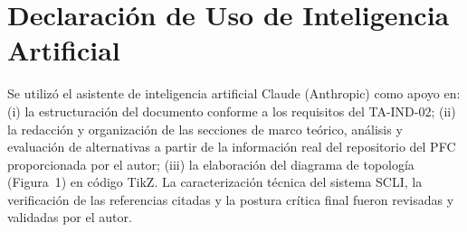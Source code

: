 \documentclass[12pt,letterpaper]{article}
\begin{document}
\section*{Declaraci\'on de Uso de Inteligencia Artificial}

Se utiliz\'o el asistente de inteligencia artificial Claude (Anthropic)
como apoyo en: (i) la estructuraci\'on del documento conforme a los
requisitos del TA-IND-02; (ii) la redacci\'on y organizaci\'on de las
secciones de marco te\'orico, an\'alisis y evaluaci\'on de alternativas a
partir de la informaci\'on real del repositorio del PFC proporcionada por
el autor; (iii) la elaboraci\'on del diagrama de topolog\'ia (Figura~1) en
c\'odigo TikZ. La caracterizaci\'on t\'ecnica del sistema SCLI, la
verificaci\'on de las referencias citadas y la postura cr\'itica final
fueron revisadas y validadas por el autor.
\end{document}
